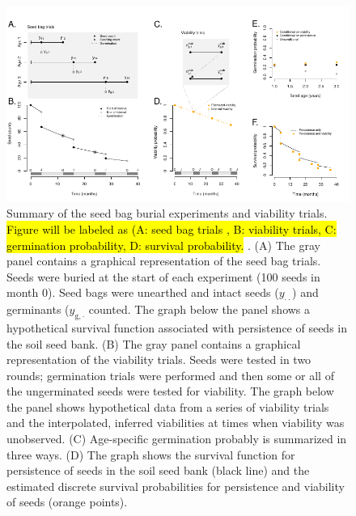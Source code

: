\documentclass[12pt, oneside, titlepage]{article}   	%
\begin{document}
 \begin{figure}[!h]
   \centering
       \includegraphics[page=1,width=1\textwidth]{../../manuscript/figures/seed-bag-figure.pdf}  
    \caption{ Summary of the seed bag burial experiments and viability trials. \hl{Figure will be labeled as (A: seed bag trials , B: viability trials, C: germination probability, D: survival probability. }. (A) The gray panel contains a graphical representation of the seed bag trials. Seeds were buried at the start of each experiment (100 seeds in month 0). Seed bags were unearthed and intact seeds ($y_{\cdot \cdot}$) and germinants ($y_{\mathrm{g},\cdot}$ counted. The graph below the panel shows a hypothetical survival function associated with persistence of seeds in the soil seed bank. (B) The gray panel contains a graphical representation of the viability trials. Seeds were tested in two rounds; germination trials were performed and then some or all of the ungerminated seeds were tested for viability. The graph below the panel shows hypothetical data from a series of viability trials and the interpolated, inferred viabilities at times when viability was unobserved. (C) Age-specific germination probably is summarized in three ways. (D) The graph shows the survival function for persistence of seeds in the soil seed bank (black line) and the estimated discrete survival probabilities for persistence and viability of seeds (orange points). }
 \label{fig:seed-bag-experiments}
\end{figure}
\end{document}
